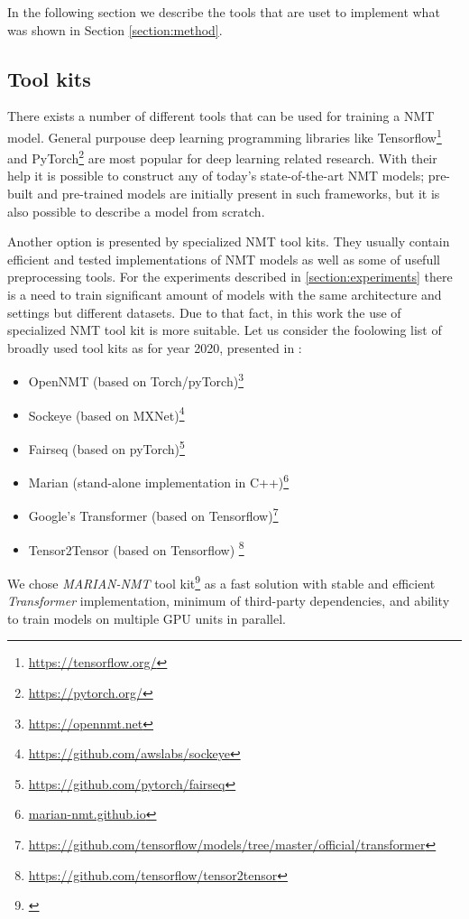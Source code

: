 In the following section we describe the tools that are uset to implement
what was shown in Section \ref{section:method}.

\subsection{Tool kits}

There exists a number of different tools that can be used for training a NMT model.
General purpouse deep learning programming libraries like
Tensorflow\footnote{\url{https://tensorflow.org/}} and
PyTorch\footnote{\url{https://pytorch.org/}} are most popular for deep learning related
research. With their help it is possible to construct any of today's state-of-the-art
NMT models; pre-built and pre-trained models are initially present in such frameworks,
but it is also possible to describe a model from scratch.

Another option is presented by specialized NMT tool kits.
They usually contain efficient and tested implementations of NMT models as well as some of
usefull preprocessing tools.
For the experiments described in \ref{section:experiments} there is a need to train significant
amount of models with the same architecture and settings but different datasets.
Due to that fact, in this work the use of specialized NMT tool kit is more suitable.
Let us consider the foolowing list of broadly used tool kits as for year 2020,
presented in \cite{koehn_2020}:

\begin{itemize}
  \item OpenNMT (based on Torch/pyTorch)\footnote{\url{https://opennmt.net}}
  \item Sockeye (based on MXNet)\footnote{\url{https://github.com/awslabs/sockeye}}
  \item Fairseq (based on pyTorch)\footnote{\url{https://github.com/pytorch/fairseq}}
  \item Marian (stand-alone implementation in C++)\footnote{\url{marian-nmt.github.io}}
  \item Google's Transformer (based on Tensorflow)\footnote{\url{
    https://github.com/tensorflow/models/tree/master/official/transformer}}
  \item Tensor2Tensor (based on Tensorflow) \footnote{\url{
    https://github.com/tensorflow/tensor2tensor}}
\end{itemize}

We chose \textit{MARIAN-NMT} tool kit\footnote{\cite{mariannmt}} as a fast solution
with stable and efficient \textit{Transformer} \cite{vaswani-2017-transformer} implementation,
minimum of third-party dependencies, and ability to train models on multiple GPU units in parallel.


